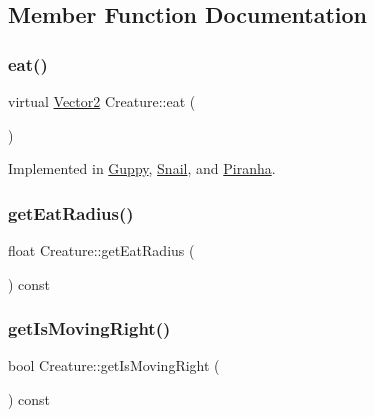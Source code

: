 \subsection{Member Function Documentation}
\mbox{\label{class_creature_a0d531a4c04c1021833ddb0e48864dbf4}} 
\subsubsection{\texorpdfstring{eat()}{eat()}}
{\footnotesize\ttfamily virtual \mbox{\hyperlink{struct_vector2}{Vector2}} Creature\+::eat (\begin{DoxyParamCaption}{ }\end{DoxyParamCaption})\hspace{0.3cm}{\ttfamily [pure virtual]}}



Implemented in \mbox{\hyperlink{class_guppy_aaeab888b423fd0ea3cc911b974b04f48}{Guppy}}, \mbox{\hyperlink{class_snail_a0905a469c6333970b8246abca37795f1}{Snail}}, and \mbox{\hyperlink{class_piranha_a125847235bdbd0e8c676dcada0d86c14}{Piranha}}.

\mbox{\label{class_creature_a24e52cedddd872269f83671c9a6f6925}} 
\subsubsection{\texorpdfstring{get\+Eat\+Radius()}{getEatRadius()}}
{\footnotesize\ttfamily float Creature\+::get\+Eat\+Radius (\begin{DoxyParamCaption}{ }\end{DoxyParamCaption}) const}

\mbox{\label{class_creature_a63abd829cfac5d57425452b39f2a21b7}} 
\subsubsection{\texorpdfstring{get\+Is\+Moving\+Right()}{getIsMovingRight()}}
{\footnotesize\ttfamily bool Creature\+::get\+Is\+Moving\+Right (\begin{DoxyParamCaption}{ }\end{DoxyParamCaption}) const}

